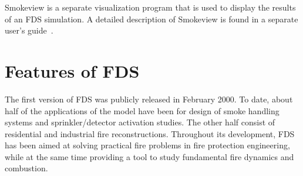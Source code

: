 \documentclass[11pt]{book}
\begin{document}
Smokeview is a separate visualization program that is used to display the
results of an FDS simulation.
A detailed description of Smokeview is found in
a separate user's guide~\cite{Smokeview_Users_Guide}.


\section{Features of FDS}

The first version of FDS was publicly released in February 2000.
To date, about half of the applications of the model have been for design of smoke
handling systems and sprinkler/detector activation studies. The other half consist of
residential and industrial fire reconstructions. Throughout its development, FDS has
been aimed at solving practical fire problems in fire protection engineering, while
at the same time providing a tool to study fundamental fire dynamics and combustion.
\end{document}

